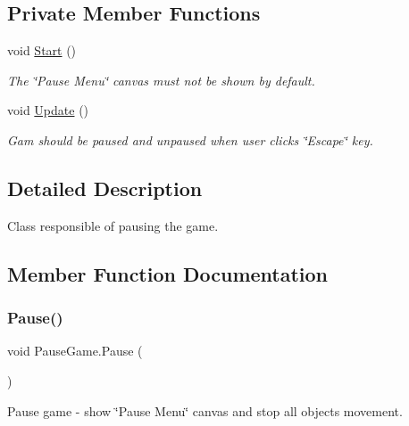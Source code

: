 \subsection*{Private Member Functions}
\begin{DoxyCompactItemize}
\item 
void \mbox{\hyperlink{class_pause_game_ad8c1d801b6da90aee58fdd8b0b2f2b97}{Start}} ()
\begin{DoxyCompactList}\small\item\em The \char`\"{}\+Pause Menu\char`\"{} canvas must not be shown by default. \end{DoxyCompactList}\item 
void \mbox{\hyperlink{class_pause_game_ab0e714ec7b02d822c8491abba21d55fb}{Update}} ()
\begin{DoxyCompactList}\small\item\em Gam should be paused and unpaused when user clicks \char`\"{}\+Escape\char`\"{} key. \end{DoxyCompactList}\end{DoxyCompactItemize}


\subsection{Detailed Description}
Class responsible of pausing the game. 



\subsection{Member Function Documentation}
\mbox{\label{class_pause_game_a931478b9fc65d240b62a1cfa68607684}} 
\subsubsection{\texorpdfstring{Pause()}{Pause()}}
{\footnotesize\ttfamily void Pause\+Game.\+Pause (\begin{DoxyParamCaption}{ }\end{DoxyParamCaption})}



Pause game -\/ show \char`\"{}\+Pause Menu\char`\"{} canvas and stop all objects\textquotesingle{} movement. 

\mbox{\label{class_pause_game_a70d2c89455ef1f1970d5fc7b791b7566}} 
